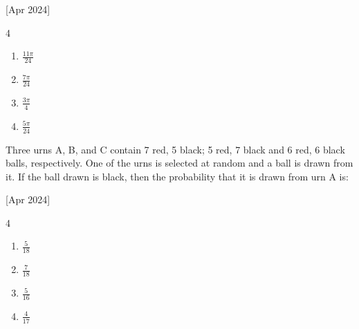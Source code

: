     \hfill{[Apr 2024]}

        \begin{multicols}{4}
            \begin{enumerate}
                \item $\frac{11\pi}{24}$
                \item $\frac{7\pi}{24}$
                \item $\frac{3\pi}{4}$
                \item $\frac{5\pi}{24}$
            \end{enumerate}
        \end{multicols}

    \item Three urns A, B, and C contain 7 red, 5 black; 5 red, 7 black and 6 red, 6 black balls, respectively. One of the urns is selected at random and a ball is drawn from it. If the ball drawn is black, then the probability that it is drawn from urn A is:
    
    \hfill{[Apr 2024]}

        \begin{multicols}{4}
            \begin{enumerate}
                \item $\frac{5}{18}$
                \item $\frac{7}{18}$
                \item $\frac{5}{16}$
                \item $\frac{4}{17}$
            \end{enumerate}
        \end{multicols}

